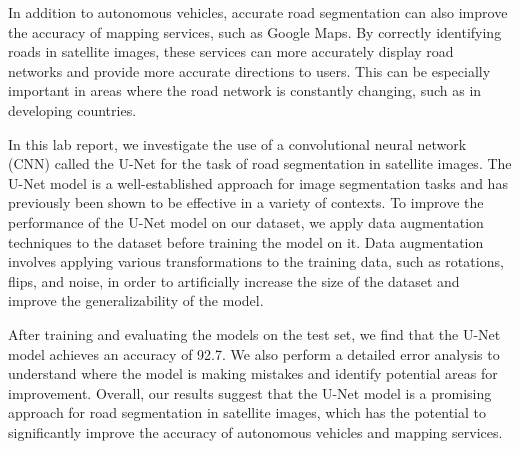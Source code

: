 \documentclass[10pt,conference,compsocconf]{IEEEtran}
\begin{document}
In addition to autonomous vehicles, accurate road segmentation can also improve the accuracy of mapping services, such as Google Maps. By correctly identifying roads in satellite images, these services can more accurately display road networks and provide more accurate directions to users. This can be especially important in areas where the road network is constantly changing, such as in developing countries.

In this lab report, we investigate the use of a convolutional neural network (CNN) called the U-Net for the task of road segmentation in satellite images. The U-Net model is a well-established approach for image segmentation tasks and has previously been shown to be effective in a variety of contexts. To improve the performance of the U-Net model on our dataset, we apply data augmentation techniques to the dataset before training the model on it. Data augmentation involves applying various transformations to the training data, such as rotations, flips, and noise, in order to artificially increase the size of the dataset and improve the generalizability of the model.

After training and evaluating the models on the test set, we find that the U-Net model achieves an accuracy of 92.7. We also perform a detailed error analysis to understand where the model is making mistakes and identify potential areas for improvement. Overall, our results suggest that the U-Net model is a promising approach for road segmentation in satellite images, which has the potential to significantly improve the accuracy of autonomous vehicles and mapping services.

\end{document}

